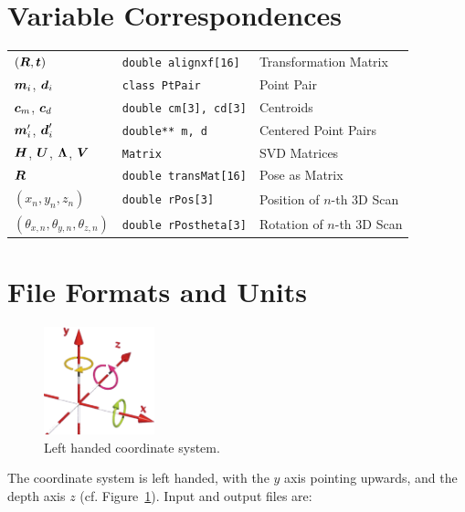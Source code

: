 \documentclass[12pt,dvips]{article}
\renewcommand{\v}[1]{\text{\boldmath $#1$}}
\newcommand{\V}[1]{\text{\boldmath $#1$}}
\newcommand{\M}[1]{\v{#1}}                     %
\begin{document}
{\begin{itemize}
\end{itemize}  

\section{Variable Correspondences}

\begin{tabular}{lll}
$(\M R, \V t)$  & \texttt{double alignxf[16]}   & Transformation
  Matrix \\
$\V m_i$, $\V d_i$  & \texttt{class PtPair}         & Point Pair\\
$\V c_m$, $\V c_d$  & \texttt{double cm[3], cd[3]}  & Centroids\\
$\V m'_i$, $\V d'_i$  & \texttt{double** m, d}      & Centered
  Point Pairs\\
$\M H$, $\M U$, $\M \Lambda$, $\M V$  & \texttt{Matrix}      & SVD
  Matrices\\
$\M R$ & \texttt{double transMat[16]} & Pose as Matrix\\
$(x_n, y_n, z_n)$ & \texttt{double rPos[3]} & Position of $n$-th 3D Scan\\
$(\theta_{x,n}, \theta_{y,n}, \theta_{z,n})$ & \texttt{double
  rPostheta[3]} & Rotation of $n$-th 3D Scan\\
\end{tabular}

\section{File Formats and Units}

\begin{figure}
\begin{center}
\includegraphics[width=3.2cm]{coordinate_system_white}
\caption{Left handed coordinate system.}\label{coord}
\end{center}
\end{figure}
The coordinate system is left handed, with the $y$ axis pointing
upwards, and the depth axis $z$ (cf. Figure~\ref{coord}). Input
and output files are:


}
\end{document}
